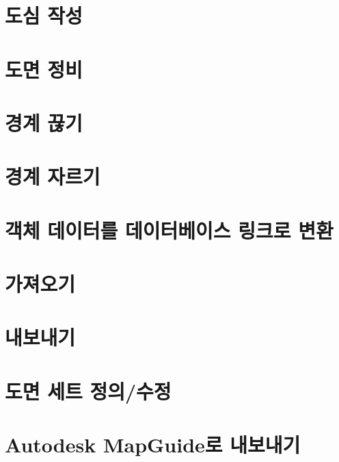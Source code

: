 \documentclass[12pt,a4paper,oneside]{book}
\begin{document}
	\section{도심 작성}
	
	\newpage
	\section{도면 정비}
	
	
	\newpage
	\section{경계 끊기}
	
	
	\newpage
	\section{경계 자르기}
	

	\newpage
	\section{객체 데이터를 데이터베이스 링크로 변환}
	

	\newpage
	\section{가져오기}
	
	\newpage
	\section{내보내기}
	
	
	\newpage
	\section{도면 세트 정의/수정}
	
	
	\newpage
	\section{Autodesk MapGuide로 내보내기}
	
\end{document}
